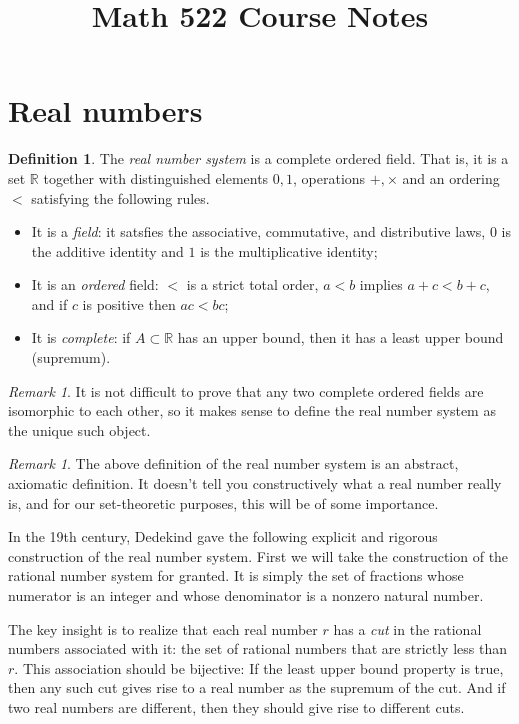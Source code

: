 \documentclass[11pt,oneside]{amsart}
\title{Math 522 Course Notes}
\newcommand{\RR}{\mathbb R}
\theoremstyle{definition}
\newtheorem{defn}[thm]{Definition}
\theoremstyle{remark}
\newtheorem{rem}[thm]{Remark}
\begin{document}
\maketitle

\section{Real numbers}

\begin{defn}
  The \emph{real number system} is a complete ordered field. That is, it is a set $\RR$ together with distinguished elements $0,1$, operations $+,\times$ and an ordering $<$ satisfying the following rules.
\begin{itemize}
\item It is a \emph{field}: it satsfies the associative, commutative, and distributive laws, $0$ is the additive identity and $1$ is the multiplicative identity;
\item It is an \emph{ordered} field: $<$ is a strict total order, $a<b$ implies $a+c<b+c$, and if $c$ is positive then $ac<bc$;
\item It is \emph{complete}: if $A\subset\RR$ has an upper bound, then it has a least upper bound (supremum).
\end{itemize}
\end{defn}

\begin{rem}
It is not difficult to prove that any two complete ordered fields are isomorphic to each other, so it makes sense to define the real number system as the unique such object.
\end{rem}

\begin{rem}
The above definition of the real number system is an abstract, axiomatic definition. It doesn't tell you constructively what a real number really is, and for our set-theoretic purposes, this will be of some importance.
\end{rem}

In the 19th century, Dedekind gave the following explicit and rigorous construction of the real number system. First we will take the construction of the rational number system for granted. It is simply the set of fractions whose numerator is an integer and whose denominator is a nonzero natural number.

The key insight is to realize that each real number $r$ has a \emph{cut} in the rational numbers associated with it: the set of rational numbers that are strictly less than $r$. This association should be bijective: If the least upper bound property is true, then any such cut gives rise to a real number as the supremum of the cut. And if two real numbers are different, then they should give rise to different cuts.
\end{document}
